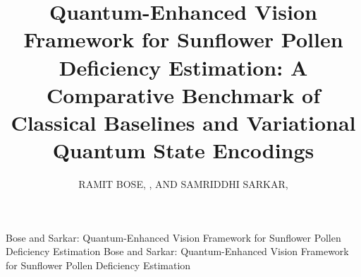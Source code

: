\documentclass{ieeeaccess}
\begin{document}

\title{Quantum-Enhanced Vision Framework for Sunflower Pollen Deficiency Estimation: A Comparative Benchmark of Classical Baselines and Variational Quantum State Encodings}

\author{\uppercase{Ramit Bose}, , AND \uppercase{Samriddhi Sarkar}, }

\address[1]{Department of Computer Science and Engineering, School of Computer Science and Engineering, Vellore Institute of Technology, Vellore 632014, Tamil Nadu, India (e-mail: ramit.bose2024@vitstudent.ac.in, samriddhi.sarkar@vit.ac.in)}


\markboth
{Bose and Sarkar: Quantum-Enhanced Vision Framework for Sunflower Pollen Deficiency Estimation}
{Bose and Sarkar: Quantum-Enhanced Vision Framework for Sunflower Pollen Deficiency Estimation}

\end{document}

